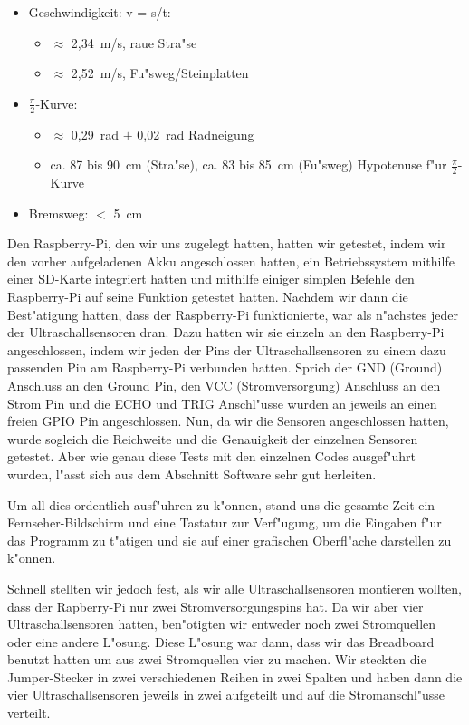 \documentclass[a4paper,12pt]{article}
\newenvironment{myitemize}{
	\begin{itemize}
		\setlength{\itemsep}{0pt}
		\setlength{\parskip}{0pt}
		\setlength{\parsep}{0pt}
}
{
	\end{itemize}
}
\begin{document}
\begin{myitemize}
	\item Geschwindigkeit: v = s/t:
	\begin{myitemize}
		\item $ \approx $ 2,34~m/s, raue Stra"se
		\item $ \approx $ 2,52~m/s, Fu"sweg/Steinplatten
	\end{myitemize}
	\item $ \frac{\pi}{2} $-Kurve:
	\begin{myitemize}
		\item $ \approx $ 0,29~rad $ \pm $ 0,02~rad Radneigung
		\item ca. 87 bis 90~cm (Stra"se), ca. 83 bis 85~cm (Fu"sweg) Hypotenuse f"ur $ \frac{\pi}{2} $-Kurve
	\end{myitemize}
	\item Bremsweg: $ < $ 5~cm
\end{myitemize}

Den Raspberry-Pi, den wir uns zugelegt hatten, hatten wir getestet, indem wir den vorher aufgeladenen Akku angeschlossen hatten, ein Betriebssystem mithilfe einer SD-Karte integriert hatten und mithilfe einiger simplen Befehle den Raspberry-Pi auf seine Funktion getestet hatten. 
Nachdem wir dann die Best"atigung hatten, dass der Raspberry-Pi funktionierte, war als n"achstes jeder der Ultraschallsensoren dran.
Dazu hatten wir sie einzeln an den Raspberry-Pi angeschlossen, indem wir jeden der Pins der Ultraschallsensoren zu einem dazu passenden Pin am Raspberry-Pi verbunden hatten.
Sprich der GND (Ground) Anschluss an den Ground Pin, den VCC (Stromversorgung) Anschluss an den Strom Pin und die ECHO und TRIG Anschl"usse wurden an jeweils an einen freien GPIO Pin angeschlossen.
Nun, da wir die Sensoren angeschlossen hatten, wurde sogleich die Reichweite und die Genauigkeit der einzelnen Sensoren getestet.
Aber wie genau diese Tests mit den einzelnen Codes ausgef"uhrt wurden, l"asst sich aus dem Abschnitt Software sehr gut herleiten.

Um all dies ordentlich ausf"uhren zu k"onnen, stand uns die gesamte Zeit ein Fernseher-Bildschirm und eine Tastatur zur Verf"ugung, um die Eingaben f"ur das Programm zu t"atigen und sie auf einer grafischen Oberfl"ache darstellen zu k"onnen.

Schnell stellten wir jedoch fest, als wir alle Ultraschallsensoren montieren wollten, dass der Rapberry-Pi nur zwei Stromversorgungspins hat.
Da wir aber vier Ultraschallsensoren hatten, ben"otigten wir entweder noch zwei Stromquellen oder eine andere L"osung.
Diese L"osung war dann, dass wir das Breadboard benutzt hatten um aus zwei Stromquellen vier zu machen.
Wir steckten die Jumper-Stecker in zwei verschiedenen Reihen in zwei Spalten und haben dann die vier Ultraschallsensoren jeweils in zwei aufgeteilt und auf die Stromanschl"usse verteilt.
\end{document}

